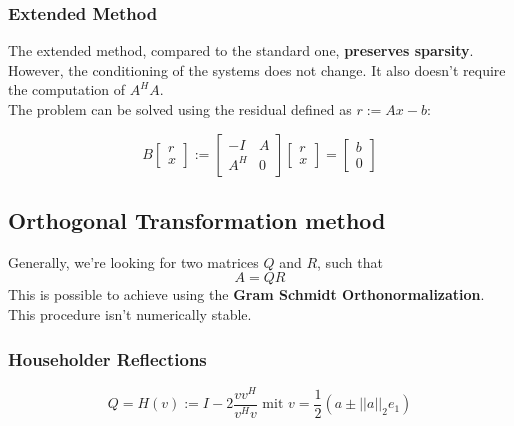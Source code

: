 \documentclass[12pt, a4paper]{article}
\begin{document}
\subsubsection{Extended Method}

The extended method, compared to the standard one, \textbf{preserves sparsity}. However, the conditioning of the systems does not change. It also doesn't require the computation of $A^HA$. \\

The problem can be solved using the residual defined as $r := Ax - b$:

\begin{equation*}
	B\begin{bmatrix}r \\ x \end{bmatrix} := \begin{bmatrix}
		-I & A \\ A^H & 0
	\end{bmatrix} \begin{bmatrix}
		r \\ x
	\end{bmatrix} = \begin{bmatrix}
		b \\ 0
	\end{bmatrix}
\end{equation*}

\subsection{Orthogonal Transformation method}

Generally, we're looking for two matrices $Q$ and $R$, such that
\begin{equation*}
	A = QR
\end{equation*}
This is possible to achieve using the \textbf{Gram Schmidt Orthonormalization}. This procedure isn't numerically stable.

\subsubsection{Householder Reflections}

\begin{tcolorbox}
\begin{equation*}
	Q = H(v) := I - 2\frac{vv^H}{v^Hv}\text{ mit } v = \frac{1}{2}(a \pm ||a||_2 e_1)
\end{equation*}
\end{tcolorbox}
\end{document}
